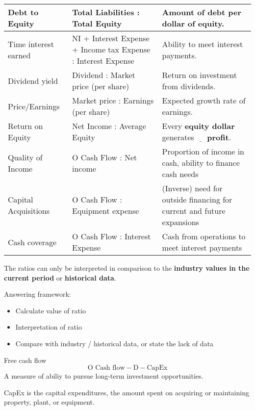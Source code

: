 \begin{table}[h]
\begin{tabular}{|p{}|p{}|p{}|}
        \hline
        Debt to Equity                 & Total Liabilities : Total Equity                              & Amount of debt per dollar of equity.                                                  \\
        \hline
        Time interest earned           & NI + Interest Expense + Income tax Expense : Interest Expense & Ability to meet interest payments.                                                    \\
        \hline
        Dividend yield                 & Dividend : Market price (per share)                           & Return on investment from dividends.                                                  \\
        \hline
        Price/Earnings                 & Market price : Earnings (per share)                           & Expected growth rate of earnings.                                                     \\
        \hline
        Return on Equity               & Net Income : Average Equity                                   & Every \textbf{equity dollar} generates $\underline{\hspace{1em}}$ \textbf{profit}.    \\
        \hline
        Quality of Income              & O Cash Flow : Net income                                      & Proportion of income in cash, ability to finance cash needs                           \\
        \hline
        Capital Acquisitions           & O Cash Flow : Equipment expense                               & (Inverse) need for outside financing for current and future expansions                \\
        \hline
        Cash coverage                  & O Cash Flow : Interest Expense                                & Cash from operations to meet interest payments                                        \\
        \hline
    \end{tabular}
\end{table}

The ratios can only be interpreted in comparison to the \textbf{industry values in the current period} or \textbf{historical data}.

Answering framework:
\begin{itemize}
    \item Calculate value of ratio
    \item Interpretation of ratio
    \item Compare with industry / historical data, or state the lack of data
\end{itemize}

\begin{knBox}
    {Free cash flow}
    \[\text{O Cash flow} - \text{D} - \text{CapEx}\]
    A measure of abiliy to pursue long-term investment opportunities.

    CapEx is the capital expenditures, the amount spent on acquiring or maintaining property, plant, or equipment.
\end{knBox}